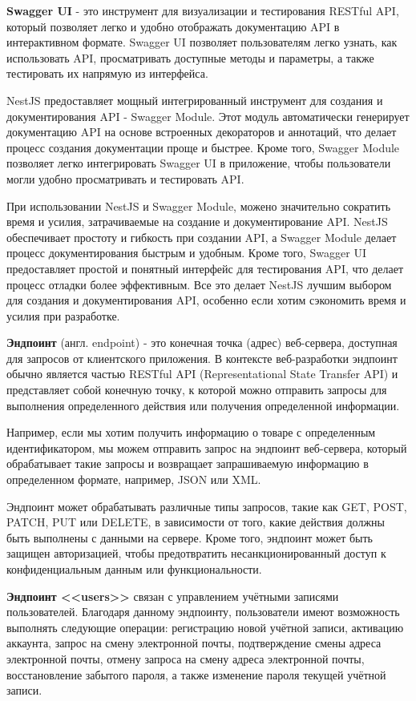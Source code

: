 \textbf{Swagger UI} - это инструмент для визуализации и тестирования RESTful API,
который позволяет легко и удобно отображать документацию API в интерактивном формате.
Swagger UI позволяет пользователям легко узнать, как использовать API, просматривать доступные методы и параметры, а также тестировать их напрямую из интерфейса.

NestJS предоставляет мощный интегрированный инструмент для создания и документирования API - Swagger Module.
Этот модуль автоматически генерирует документацию API на основе встроенных декораторов и аннотаций,
что делает процесс создания документации проще и быстрее.
Кроме того, Swagger Module позволяет легко интегрировать Swagger UI в приложение,
чтобы пользователи могли удобно просматривать и тестировать API.

При использовании NestJS и Swagger Module, можено значительно сократить время и усилия,
затрачиваемые на создание и документирование API.
NestJS обеспечивает простоту и гибкость при создании API, а Swagger Module делает процесс документирования быстрым и удобным.
Кроме того, Swagger UI предоставляет простой и понятный интерфейс для тестирования API,
что делает процесс отладки более эффективным. Все это делает NestJS лучшим выбором для создания и документирования API,
особенно если хотим сэкономить время и усилия при разработке.

\textbf{Эндпоинт} (англ. endpoint) - это конечная точка (адрес) веб-сервера, доступная для запросов от клиентского приложения.
В контексте веб-разработки эндпоинт обычно является частью RESTful API (Representational State Transfer API)
и представляет собой конечную точку, к которой можно отправить запросы для выполнения определенного действия или получения определенной информации.

Например, если мы хотим получить информацию о товаре с определенным идентификатором,
мы можем отправить запрос на эндпоинт веб-сервера, который обрабатывает такие запросы и возвращает запрашиваемую информацию в определенном формате,
например, JSON или XML.

Эндпоинт может обрабатывать различные типы запросов, такие как GET, POST, PATCH, PUT или DELETE,
в зависимости от того, какие действия должны быть выполнены с данными на сервере.
Кроме того, эндпоинт может быть защищен авторизацией, чтобы предотвратить несанкционированный доступ к конфиденциальным данным или функциональности.

\textbf{Эндпоинт <<users>>} связан с управлением учётными записями пользователей.
Благодаря данному эндпоинту, пользователи имеют возможность выполнять следующие операции:
регистрацию новой учётной записи,
активацию аккаунта,
запрос на смену электронной почты,
подтверждение смены адреса электронной почты,
отмену запроса на смену адреса электронной почты,
восстановление забытого пароля,
а также изменение пароля текущей учётной записи.

